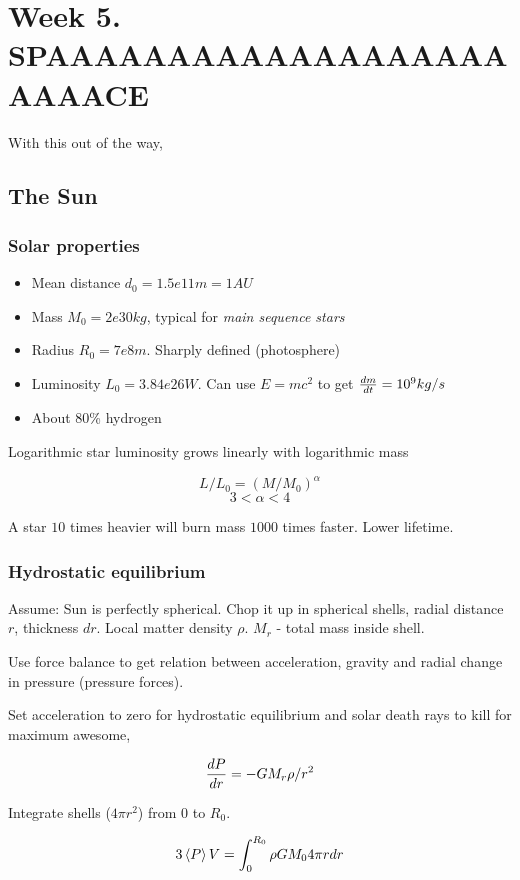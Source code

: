 \documentclass[PlasmaNotes.tex]{subfiles}
\begin{document}
\section{Week 5. SPAAAAAAAAAAAAAAAAAAAAAAACE}

With this out of the way,

\subsection{The Sun}

\subsubsection{Solar properties}
\begin{itemize}
\item Mean distance $d_0 = 1.5e11 m = 1 AU$
\item Mass $M_0=2e30 kg$, typical for \emph{main sequence stars}
\item Radius $R_0 = 7e8 m$. Sharply defined (photosphere)
\item Luminosity $L_0=3.84e26 W$. Can use $E=mc^2$ to get $\frac{d m}{d t} = 10^9 kg/s$ 
\item About 80\% hydrogen
\end{itemize}

Logarithmic star luminosity grows linearly with logarithmic mass

\[ L/L_0 = (M/M_0)^{\alpha} \]
\[ 3 < \alpha < 4\]

A star $10$ times heavier will burn mass $1000$ times faster. Lower lifetime.

\subsubsection{Hydrostatic equilibrium}

Assume: Sun is perfectly spherical. Chop it up in spherical shells, radial distance $r$, thickness $dr$. Local matter density $\rho$. $M_r$ - total mass inside shell.

Use force balance to get relation between acceleration, gravity and radial change in pressure (pressure forces).

Set acceleration to zero for hydrostatic equilibrium and solar death rays to kill for maximum awesome, 

\[ \frac{d P}{d r} = - G M_r \rho /r^2 \]

Integrate shells ($4 \pi r^2$) from $0$ to $R_0$.

\[3 \left< P \right> V = \int_0^{R_0}{\rho G M_0 4 \pi r dr} \]
\end{document}
